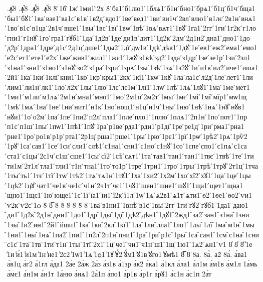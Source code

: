 {.ꙟ꙼8
.ꙟ꙽8
.ꙟꚞ8
.ꙟꚟ8
8̀
̀1б
̀1ж
̀1ми1
̀2х
8́
́ба1
́б1лю1
́1блѧ1
́б1н
́бно1
́брѧ1
́б1ц
́б1ч
́бща1
́бы1
́бꙋ1
́1ва
́вае1
́ва1с
́в1в
́1в2д
́вдо1
́1ве
́вед1
́1ви
́ви1ч
́2вл
́влю1
́в1лє
́2в1н
́внѧ1
́1во
́в1с
́в1ца
́2в1ч
́вше1
́1вы
́1вє
́1вї
́1вѡ
́1вѣ
́1вѧ
́вѧт1
́1вꙋ
́1га1
́2гг
́1ги
́1г2к
́г1ло
́гни1
́г1нꙋ
́1го
́гра1
́гꙋб1
́1да
́1д2в
́1де
́ди1в
́дит1
́1д2к
́2дм
́2д1н2
́дна1
́дно1
́1до
́д2р
́1дра1
́1дре
́д1с
́2д1ц
́дше1
́1ды2
́1дї
́дѡ1в
́1дѣ
́дѣв1
́1дꙋ
́1е
́ев1
́еж2
́ема1
́емо1
́е2с
́ет1
́ете1
́е2х
́1же
́жив1
́жил1
́1жє1
́1жꙋ
́з1вѣ
́зд2
́1зда
́з1др
́1зе
́зе1р
́1зи
́2зл1
́з1на1
́зни1
́з1но1
́з1нꙋ
́зо2
́з1ра
́1зри
́1зрѧ
́1зы
́1зѣ
́1зѧ
́1з2ꙋ
́1и
́и1в
́ил2
́иче1
́иша1
́2й1
́1ка
́1ки
́1клї
́кни1
́1ко
́1кр
́кры1
́2кх
́1кї1
́1кѡ
́1кꙋ
́1ла
́ла1с
́л2д
́1ле
́лет1
́1ли
́лим1
́ли1н
́лк1
́1ло
́л2х
́1лы
́1лю
́1лє
́лє1м
́1лї1
́1лѡ
́1лѣ
́1лѧ
́1лꙋ1
́1ма
́1ме
́мет1
́1ми1
́м1ли
́м1лѧ
́2м1н
́мна1
́мно1
́1мо
́2м1п
́2м2т
́1мы
́1мє
́1мі
́1мї
́мїр1
́мѡ1щ
́1мѣ
́1мѧ
́1на
́1не
́1ни
́нит1
́н1к
́1но
́нощ1
́н1ц
́н1ч
́1ны
́1ню
́1нѣ
́1нѧ
́1нꙋ
́нꙋв1
́нꙋи1
́1о
́о2м
́1па
́1пе
́1пи2
́п2л
́пла1
́1пле
́пло1
́1плю
́1плѧ1
́2п1н
́1по
́пот1
́1пр
́п1с
́п1ш
́1пы
́1пѡ1
́1пѣ1
́1пꙋ
́1ра
́р1ве
́рда1
́рди1
́р1дї
́1ре
́ре1д
́1ри
́рма1
́рна1
́рне1
́1ро
́ро1в
́р1р
́рта1
́2р1ц
́рша1
́рше1
́1ры
́1рю
́1рє1
́1рї
́1рѡ
́1рѣ2
́1рѧ
́1рѷ2
́1рꙋ
́1са
́сав1
́1се
́1си
́сли1
́слѣ1
́с1на1
́сни1
́с1но
́с1нꙋ
́1со
́1спе
́спо1
́с1пѧ
́с1са
́ста1
́с1цы
́2с1ч
́с1ш
́сше1
́1сы
́сї2
́1сѣ
́сѧт1
́1та
́тав1
́таи1
́тан1
́1твє
́1твѣ
́1те
́1ти
́ти1м
́2т1л
́тла1
́тли1
́т1н
́тна1
́1то
́то1р
́1тре
́1три1
́1тро
́1тры
́1трѣ
́1трꙋ
́2т1ц
́1тча
́1ты
́ть1
́1тє
́1тї
́1тѡ
́1тѣ2
́1тѧ
́тѧ1н
́1тꙋ1
́1ха
́1хи2
́1х2м
́1хо
́хї2
́хꙋ1
́1ца
́1це
́1цы
́1цѣ2
́1цꙋ
́чат1
́че1в
́че1с
́ч1н
́2ч1т
́чє1
́1чꙋ1
́шен1
́шне1
́шꙋ1
́1ща1
́щет1
́щна1
́щно1
́1щє1
́1ю
́юще1
́1є
́1ї
́їа1
́їи1
́ї2к
́ї1л
́1ѡ
́1ѧ
́ѧ2в1
́ѧ1т
́ѧти1
́ѳ2
́1ѳе1
́ѳо2
́ѵи1
́ѵ2к
́ѵ2с
́1ѻ
8̂
8̅
8̆
8̇
8̈
8̋
8̏
8̑
̑1ва
̑в1ни1
̑1внѣ
̑в1с
̑1вы
̑2гг
̑1ги
̑гꙋ2
̑гꙋб1
̑1да1
̑даю1
̑ди1
̑1д2к
̑2д1н
̑дни1
̑1до1
̑1др
̑1ды
̑1дї
̑1дѣ2
̑дѣн1
̑1дꙋ1
̑2жд1
̑за2
̑зан1
̑з1на
̑1зни
̑1зы
̑1и2
̑ин1
̑2й1
̑йши1
̑1ка
̑1ки
̑2кл
̑1кї1
̑1ла
̑1ли
̑лла1
̑1ло1
̑1лы
̑1лї
̑1ма
̑м1н
̑1мы
̑1ни1
̑1ны
̑1нѧ
̑1па2
̑1пи1
̑1п2л
̑2п1н
̑пни1
̑1ра
̑1ри
̑р1с
̑1ры
̑1са
̑сан1
̑1см
̑с1на
̑1сни
̑с1с
̑1та
̑1тв
̑1ти
̑т1н
̑1ты
̑1тї
̑2х1
̑1ц
̑че1
̑чи1
̑ч1н
̑ш1
̑1щ
̑1ю1
̑1ѧ2
̑ѧн1
̑ѵ1
8̓
8̔
8̾
̾1е
̾1и
̾и́1
̾и1м
̾1н
̾не1
̾2с2
̾1ѡ1
̾1ѧ
̾1ѻ1
̾1ꙋ
̾ꙋ́2
̾ꙋ́м1
̾ꙋ1в
̾ꙋго1
̾ꙋмѣ1
8̿
8͘
8а.
8а̀.
а2́
8а́.
а́ва1
а́в1ц
а́г2
а́1гл
а́да1
2а́е
2а́ж
2а́з
а́з1в
а́1зр
а́к2
а́ка1
а́1кл
а́ла1
а́л1м
а́м1в
а́м1л
1а́мь
а́мє1
а́н1м
а́н1т
1а́ню
а́нѧ1
2а́1п
а́по1
а́р1в
а́р1г
а́рꙋ1
а́с1н
а́с1п
2а́т
}

